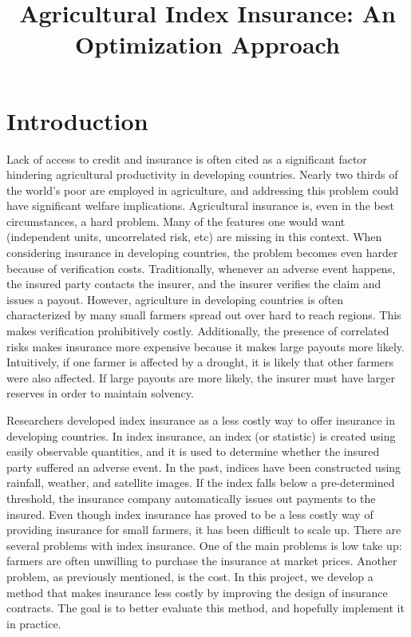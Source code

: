 \documentclass[12pt]{article}
\title{Agricultural Index Insurance: An Optimization Approach}
\date{}
\begin{document}
\maketitle
\section{Introduction}
Lack of access to credit and insurance is often cited as a significant factor hindering agricultural productivity in developing countries. Nearly two thirds of the world's poor are employed in agriculture, and addressing this problem could have significant welfare implications. Agricultural insurance is, even in the best circumstances, a hard problem. Many of the features one would want (independent units, uncorrelated risk, etc) are missing in this context. When considering insurance in developing countries, the problem becomes even harder because of verification costs. Traditionally, whenever an adverse event happens, the insured party contacts the insurer, and the insurer verifies the claim and issues a payout. However, agriculture in developing countries is often characterized by many small farmers spread out over hard to reach regions. This makes verification prohibitively costly. Additionally, the presence of correlated risks makes insurance more expensive because it makes large payouts more likely. Intuitively, if one farmer is affected by a drought, it is likely that other farmers were also affected. If large payouts are more likely, the insurer must have larger reserves in order to maintain solvency. 

Researchers developed index insurance as a less costly way to offer insurance in developing countries. In index insurance, an index (or statistic) is created using easily observable quantities, and it is used to determine whether the insured party suffered an adverse event. In the past, indices have been constructed using rainfall, weather, and satellite images. If the index falls below a pre-determined threshold, the insurance company automatically issues out payments to the insured. Even though index insurance has proved to be a less costly way of providing insurance for small farmers, it has been difficult to scale up. There are several problems with index insurance. One of the main problems is low take up: farmers are often unwilling to purchase the insurance at market prices. Another problem, as previously mentioned, is the cost. In this project, we develop a method that makes insurance less costly by improving the design of insurance contracts. The goal is to better evaluate this method, and hopefully implement it in practice.
\end{document}
